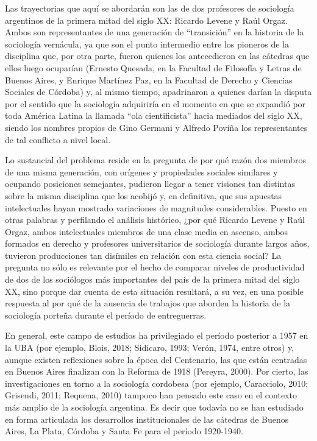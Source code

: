 Las trayectorias que aquí se abordarán son las de dos profesores de sociología argentinos de la primera mitad del siglo XX: Ricardo Levene y Raúl Orgaz. Ambos son representantes de una generación de ``transición'' en la historia de la sociología vernácula, ya que son el punto intermedio entre los pioneros de la disciplina que, por otra parte, fueron quienes los antecedieron en las cátedras que ellos luego ocuparían (Ernesto Quesada, en la Facultad de Filosofía y Letras de Buenos Aires, y Enrique Martínez Paz, en la Facultad de Derecho y Ciencias Sociales de Córdoba) y, al mismo tiempo, apadrinaron a quienes darían la disputa por el sentido que la sociología adquiriría en el momento en que se expandió por toda América Latina la llamada ``ola cientificista'' hacia mediados del siglo XX, siendo los nombres propios de Gino Germani y Alfredo Poviña los representantes de tal conflicto a nivel local.

Lo sustancial del problema reside en la pregunta de por qué razón dos miembros de una misma generación, con orígenes y propiedades sociales similares y ocupando posiciones semejantes, pudieron llegar a tener visiones tan distintas sobre la misma disciplina que los acobijó y, en definitiva, que sus apuestas intelectuales hayan mostrado variaciones de magnitudes considerables. Puesto en otras palabras y perfilando el análisis histórico, ¿por qué Ricardo Levene y Raúl Orgaz, ambos intelectuales miembros de una clase media en ascenso, ambos formados en derecho y profesores universitarios de sociología durante largos años, tuvieron producciones tan disímiles en relación con esta ciencia social? La pregunta no sólo es relevante por el hecho de comparar niveles de productividad de dos de los sociólogos más importantes del país de la primera mitad del siglo XX, sino porque dar cuenta de esta situación resultará, a su vez, en una posible respuesta al por qué de la ausencia de trabajos que aborden la historia de la sociología porteña durante el período de entreguerras.

En general, este campo de estudios ha privilegiado el período posterior a 1957 en la UBA (por ejemplo, Blois, 2018; Sidicaro, 1993; Verón, 1974, entre otros) y, aunque existen reflexiones sobre la época del Centenario, las que están centradas en Buenos Aires finalizan con la Reforma de 1918 (Pereyra, 2000). Por cierto, las investigaciones en torno a la sociología cordobesa (por ejemplo, Caracciolo, 2010; Grisendi, 2011; Requena, 2010) tampoco han pensado este caso en el contexto más amplio de la sociología argentina. Es decir que todavía no se han estudiado en forma articulada los desarrollos institucionales de las cátedras de Buenos Aires, La Plata, Córdoba y Santa Fe para el período 1920-1940.

